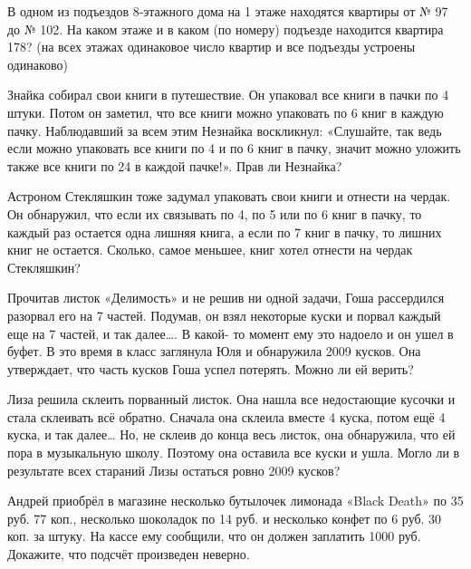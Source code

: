 \begin{thm}
    В одном из подъездов 8-этажного дома на 1 этаже находятся квартиры от № 97 до № 102.
На каком этаже и в каком (по номеру) подъезде находится квартира 178? (на всех этажах одинаковое
число квартир и все подъезды устроены одинаково)
\end{thm}

\begin{thm}
Знайка собирал свои книги в путешествие. Он упаковал все книги в
пачки по 4 штуки. Потом он заметил, что все книги можно упаковать по 6 книг в
каждую пачку. Наблюдавший за всем этим Незнайка воскликнул: «Слушайте, так
ведь если можно упаковать все книги по 4 и по 6 книг в пачку, значит можно
уложить также все книги по 24 в каждой пачке!». Прав ли Незнайка?
\end{thm}

\begin{thm}
    Астроном Стекляшкин тоже задумал упаковать свои книги и отнести на
чердак. Он обнаружил, что если их связывать по 4, по 5 или по 6 книг в пачку, то
каждый раз остается одна лишняя книга, а если по 7 книг в пачку, то лишних книг
не остается. Сколько, самое меньшее, книг хотел отнести на чердак Стекляшкин?
\end{thm}

\begin{thm}
    Прочитав листок «Делимость» и не решив ни одной задачи, Гоша рассердился разорвал его
    на 7 частей. Подумав, он взял некоторые куски и порвал каждый еще на 7 частей, и так далее…. В какой-
    то момент ему это надоело и он ушел в буфет. В это время в класс заглянула Юля и обнаружила 2009
    кусков. Она утверждает, что часть кусков Гоша успел потерять. Можно ли ей верить?
\end{thm}

\begin{thm}
    Лиза решила склеить порванный листок. Она нашла все недостающие кусочки и стала
склеивать всё обратно. Сначала она склеила вместе 4 куска, потом ещё 4 куска, и так
далее… Но, не склеив до конца весь листок, она обнаружила, что ей пора в музыкальную школу. Поэтому она оставила все куски и ушла. Могло ли в результате всех стараний Лизы остаться ровно 2009 кусков?
\end{thm}

\begin{thm}
    Андрей приобрёл в магазине несколько бутылочек лимонада «Black Death» по 35 руб. 77 коп.,
несколько шоколадок по 14 руб. и несколько конфет по 6 руб. 30 коп. за штуку. На кассе ему сообщили, что он должен заплатить 1000 руб. Докажите, что подсчёт произведен неверно.
\end{thm}

